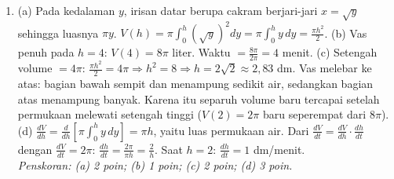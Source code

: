 \documentclass[a4paper,11pt]{article}
\begin{document}
\begin{enumerate}[leftmargin=2em,itemsep=3pt,topsep=2pt]
\item[\textbf{5.}] (a) Pada kedalaman $y$, irisan datar berupa cakram berjari-jari $x=\sqrt y$ sehingga luasnya $\pi y$. $V(h)=\pi\int_0^h\left(\sqrt y\right)^2dy=\pi\int_0^hy\,dy=\frac{\pi h^2}{2}$. (b) Vas penuh pada $h=4$: $V(4)=8\pi$ liter. Waktu $=\frac{8\pi}{2\pi}=4$ menit. (c) Setengah volume $=4\pi$: $\frac{\pi h^2}{2}=4\pi\Rightarrow h^2=8\Rightarrow h=2\sqrt2\approx2{,}83$ dm. Vas melebar ke atas: bagian bawah sempit dan menampung sedikit air, sedangkan bagian atas menampung banyak. Karena itu separuh volume baru tercapai setelah permukaan melewati setengah tinggi ($V(2)=2\pi$ baru seperempat dari $8\pi$). (d) $\frac{dV}{dh}=\frac{d}{dh}\left[\pi\int_0^hy\,dy\right]=\pi h$, yaitu luas permukaan air. Dari $\frac{dV}{dt}=\frac{dV}{dh}\cdot\frac{dh}{dt}$ dengan $\frac{dV}{dt}=2\pi$: $\frac{dh}{dt}=\frac{2\pi}{\pi h}=\frac2h$. Saat $h=2$: $\frac{dh}{dt}=1$ dm/menit. \\ \textit{Penskoran: (a) 2 poin; (b) 1 poin; (c) 2 poin; (d) 3 poin.}
\end{enumerate}
\end{document}
